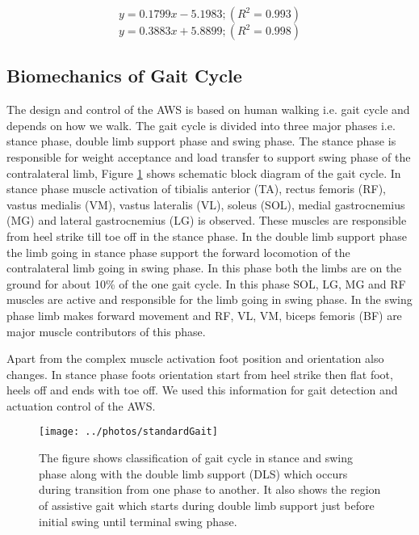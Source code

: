 \documentclass[letterpaper, 10 pt, conference]{ieeeconf}  %
\begin{document}
\begin{equation}\label{pgmunstreched}
y=0.1799x - 5.1983; (R^2=0.993)
\end{equation}
\begin{equation}\label{pgmstreched}
y = 0.3883x + 5.8899; (R^2=0.998)
\end{equation}

\subsection{Biomechanics of Gait Cycle } \label{gaitcycle}
The design and control of the AWS is based on human walking i.e. gait cycle and depends on how we walk. The gait cycle is divided into three major phases i.e. stance phase, double limb support phase and swing phase. The stance phase is responsible for weight acceptance and load transfer to support swing phase of the contralateral limb, Figure \ref{fig:standardgait} shows schematic block diagram of the gait cycle. In stance phase muscle activation of tibialis anterior (TA), rectus femoris (RF), vastus medialis (VM), vastus lateralis (VL), soleus (SOL), medial gastrocnemius (MG) and lateral gastrocnemius (LG) is observed. These muscles are responsible from heel strike till toe off in the stance phase. In the double limb support phase the limb going in stance phase support the forward locomotion of the contralateral limb going in swing phase. In this phase both the limbs are on the ground for about 10\% of the one gait cycle. In this phase SOL, LG, MG and RF muscles are active and responsible for the limb going in swing phase. In the swing phase limb makes forward movement and RF, VL, VM, biceps femoris (BF) are major muscle contributors of this phase. 

Apart from the complex muscle activation foot position and orientation also changes. In stance phase foots orientation start from heel strike then flat foot, heels off and ends with toe off. We used this information for gait detection and actuation control of the AWS.
\begin{figure}
	\centering
	\texttt{[image: ../photos/standardGait]}
	\caption{The figure shows classification of gait cycle in stance and swing phase along with the double limb support (DLS) which occurs during transition from one phase to another. It also shows the region of assistive gait which starts during double limb support just before initial swing until terminal swing phase.}
	\label{fig:standardgait}
\end{figure}
\end{document}
